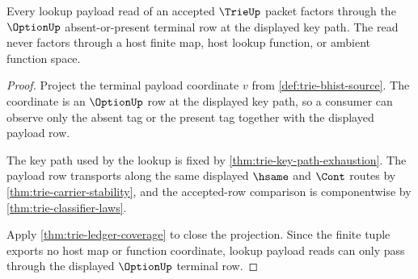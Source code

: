 \begin{theorem}\label{thm:trie-lookup-payload-projection}
Every lookup payload read of an accepted $\TrieUp$ packet factors through the
$\OptionUp$ absent-or-present terminal row at the displayed key path. The
read never factors through a host finite map, host lookup function, or ambient
function space.
\end{theorem}
\begin{proof}
Project the terminal payload coordinate $v$ from
\autoref{def:trie-bhist-source}. The coordinate is an $\OptionUp$ row at the
displayed key path, so a consumer can observe only the absent tag or the
present tag together with the displayed payload row.

The key path used by the lookup is fixed by
\autoref{thm:trie-key-path-exhaustion}. The payload row transports along the
same displayed $\hsame$ and $\Cont$ routes by
\autoref{thm:trie-carrier-stability}, and the accepted-row comparison is
componentwise by \autoref{thm:trie-classifier-laws}.

Apply \autoref{thm:trie-ledger-coverage} to close the projection. Since the
finite tuple exports no host map or function coordinate, lookup payload reads
can only pass through the displayed $\OptionUp$ terminal row.
\end{proof}

